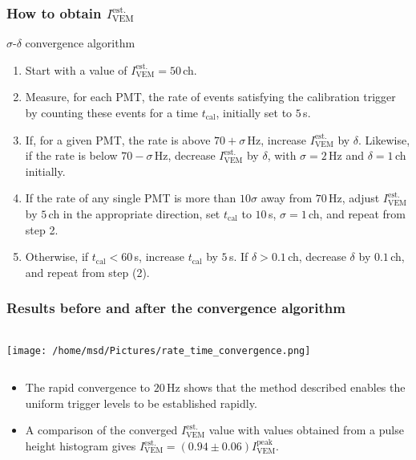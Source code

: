 \documentclass[aspectratio=169]{beamer}
\begin{document}
\begin{frame}
  \frametitle{How to obtain $I^{\mathrm{est.}}_{\mathrm{VEM}}$}
  $\sigma$-$\delta$ convergence algorithm
  \begin{enumerate}
    \item<1-> Start with a value of
      $I^{\mathrm{est.}}_{\mathrm{VEM}}=50$\,ch.
    \item<2-> Measure, for each PMT, the rate of events
      satisfying the calibration trigger by counting these events
      for a time $t_\mathrm{cal}$, initially set to $5$\,s.
    \item<3-> If, for a given PMT, the rate is above
      $70+\sigma$\,Hz, increase
      $I^{\mathrm{est.}}_{\mathrm{VEM}}$ by $\delta$. Likewise,
      if the rate is below $70-\sigma$\,Hz, decrease
      $I^{\mathrm{est.}}_{\mathrm{VEM}}$ by $\delta$, with
      $\sigma=2$\,Hz and $\delta=1$\,ch initially.
    \item<4-> If the rate of any single PMT is more than
      $10\sigma$ away from $70$\,Hz, adjust
      $I^{\mathrm{est.}}_{\mathrm{VEM}}$ by $5$\,ch in the
      appropriate direction, set $t_\mathrm{cal}$ to $10$\,s,
      $\sigma=1$\,ch, and repeat from step 2.
    \item<5-> Otherwise, if $t_\mathrm{cal}<60$\,s, increase
      $t_\mathrm{cal}$ by $5$\,s. If $\delta>0.1$\,ch, decrease 
      $\delta$ by $0.1$\,ch, and repeat from step (2).
  \end{enumerate}
\end{frame}


\begin{frame}
  \frametitle{Results before and after the convergence algorithm}
  \begin{columns}
    \begin{column}{.42\textwidth}
      \texttt{[image: /home/msd/Pictures/rate\_time\_convergence.png]}
    \end{column}
  \end{columns}
  \begin{itemize}
    \item<2-> The rapid convergence to $20$\,Hz shows that the
      method described enables the uniform trigger levels to be
      established rapidly.
    \item<3-> A comparison of the converged
      $I^{\mathrm{est.}}_{\mathrm{VEM}}$ value with values
      obtained from a pulse height histogram gives
      $I^{\mathrm{est.}}_{\mathrm{VEM}}=(0.94\pm0.06)I^{\mathrm{peak}}_{\mathrm{VEM}}$.
  \end{itemize}
\end{frame}
\end{document}
